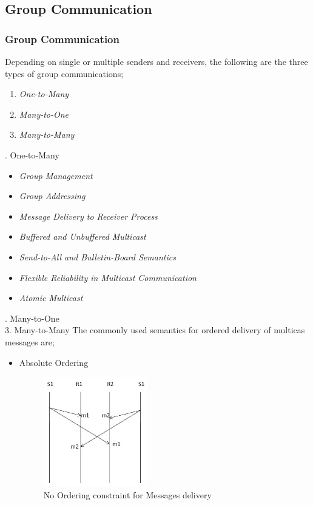 \documentclass{beamer}
\begin{document}
\subsection{Group Communication}
\begin{frame}[allowframebreaks]
	\frametitle{Group Communication}
	Depending on single or multiple senders and receivers, the following are the three 
	types of group communications;
	\begin{enumerate}
		\item \textit{One-to-Many}
		\item \textit{Many-to-One}
		\item \textit{Many-to-Many}
	\end{enumerate}	
	\vspace{4cm}
	. One-to-Many
	\begin{itemize}
				\item \textit{Group Management}
				\item \textit{Group Addressing}
				\item \textit{Message Delivery to Receiver Process}
				\item \textit{Buffered and Unbuffered Multicast}
				\item \textit{Send-to-All and Bulletin-Board Semantics}
				\item \textit{Flexible Reliability in Multicast Communication}
				\item \textit{Atomic Multicast}
	\end{itemize}
	\vspace{2cm}
	. Many-to-One\\
	3. Many-to-Many
	The commonly used semantics for ordered delivery of multicas messages are;
	\begin{itemize}
		\item Absolute Ordering
		\begin{figure}
			\centering
			\includegraphics[width=4.5cm]{fig314.jpg}
			\caption{No Ordering constraint for Messages delivery}	
			\label{fig314}
		\end{figure}

\end{itemize}
\end{frame}
\end{document}
